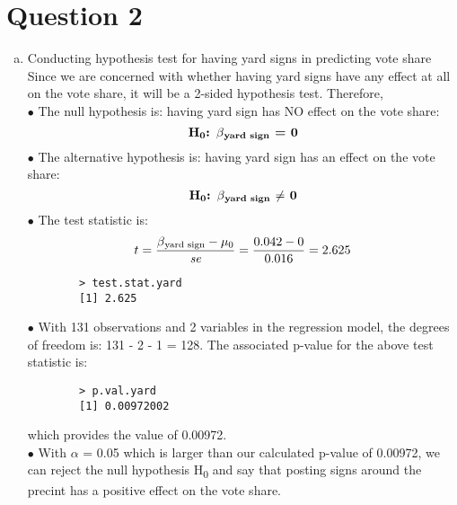 \documentclass[12pt,letterpaper]{article}
\begin{document}
	\section{Question 2}
	\begin{enumerate} [(a)]
		\item Conducting hypothesis test for having yard signs in predicting vote share \\
		Since we are concerned with whether having yard signs have any effect at all on the vote share, it will be a 2-sided hypothesis test. Therefore, \\
		$\bullet$ The null hypothesis is: having yard sign has NO effect on the vote share:
			$${\textbf{H\textsubscript{0}: $\beta\textsubscript{yard sign}$ = 0}}$$
		$\bullet$ The alternative hypothesis is: having yard sign has an effect on the vote share:
			$${\textbf{H\textsubscript{0}: $\beta\textsubscript{yard sign}$ $\neq$ 0}}$$
		$\bullet$ The test statistic is:
		$${t = \frac{\beta\textsubscript{yard sign}	 - \mu\textsubscript{0}}{\textit{se}}} = \frac{0.042 - 0}{0.016} = 2.625 $$
		
		\begin{verbatim}
		> test.stat.yard
		[1] 2.625
		\end{verbatim}
		$\bullet$ With 131 observations and 2 variables in the regression model, the degrees of freedom is: 131 - 2 - 1 = 128. The associated p-value for the above test statistic is:
		
		\begin{verbatim}
		> p.val.yard
		[1] 0.00972002
		\end{verbatim}
		which provides the value of 0.00972. \\
		$\bullet$ With $\alpha$ = 0.05 which is larger than our calculated p-value of 0.00972, we can reject the null hypothesis H\textsubscript{0} and say that posting signs around the precint has a positive effect on the vote share. 
		

\end{enumerate}
\end{document}
